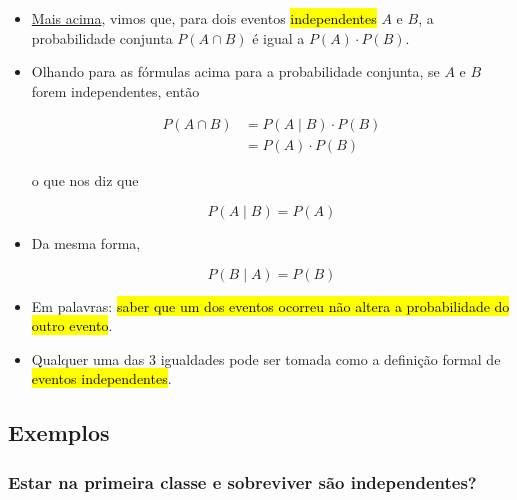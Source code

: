 \documentclass[
  11pt]{report}
\begin{document}
\begin{itemize}
\item
  \protect\hyperlink{eventos-independentes-explicaux5cux25C3ux5cux25A7ux5cux25C3ux5cux25A3o-informal}{Mais acima}, vimos que, para dois eventos {\hl{independentes}} $A$ e $B$, a probabilidade conjunta $P(A \cap B)$ é igual a $P(A) \cdot P(B)$.
\item
  Olhando para as fórmulas acima para a probabilidade conjunta, se $A$ e $B$ forem independentes, então

  \[
  \begin{aligned}
  P(A \cap B) &= P(A \mid B) \cdot P(B) \\
              &= P(A) \cdot P(B)
  \end{aligned}
  \]

  o que nos diz que

  \[
  P(A \mid B) = P(A)
  \]
\item
  Da mesma forma,

  \[
  P(B \mid A) = P(B)
  \]
\item
  Em palavras: {\hl{saber que um dos eventos ocorreu não altera a probabilidade do outro evento}}.
\item
  Qualquer uma das $3$ igualdades pode ser tomada como a definição formal de {\hl{eventos independentes}}.
\end{itemize}

\hypertarget{exemplos}{%
\subsection{Exemplos}\label{exemplos}}

\hypertarget{estar-na-primeira-classe-e-sobreviver-suxe3o-independentes}{%
\subsubsection*{Estar na primeira classe e sobreviver são independentes?}\label{estar-na-primeira-classe-e-sobreviver-suxe3o-independentes}}
\end{document}
